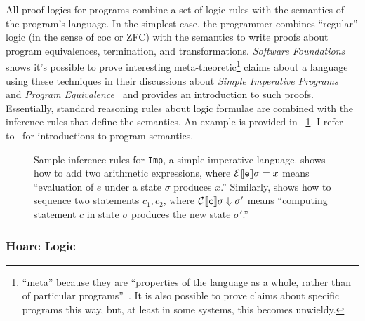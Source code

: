 All proof-logics for programs combine a set of logic-rules with the semantics of
the program's language. In the simplest case, the programmer combines
``regular'' logic (in the sense of \gls{coc} or ZFC) with the semantics to write
proofs about program equivalences, termination, and transformations.
\emph{Software Foundations} shows it's possible to prove interesting
meta-theoretic\footnote{``meta'' because they are ``properties of the language
as a whole, rather than of particular programs''~\cite{Pierce:SF2}. It is also
possible to prove claims about specific programs this way, but, at least in some
systems, this becomes unwieldy.} claims about a language using these techniques
in their discussions about \emph{Simple Imperative Programs}~\cite{Pierce:SF1}
and \emph{Program Equivalence}~\cite{Pierce:SF2} and provides an introduction to
such proofs. Essentially, standard reasoning rules about logic formulae are
combined with the inference rules that define the semantics. An example is
provided in \figurename~\ref{F:Imp_ex}. I refer
to~\cite{Winskel_1993,Harper_2016} for introductions to program semantics.

\begin{figure}
    \centering
    \caption{Sample inference rules for \texttt{Imp}, a simple imperative
    language.  shows how to add two arithmetic expressions, where
    \(\eval{e}{\sigma} = x\) means ``evaluation of \(e\) under a state
    \(\sigma\) produces \(x\).'' Similarly,  shows how to sequence
    two statements \(c_1, c_2\), where \(\comp{c}{\sigma} \DownTo \sigma'\)
    means ``computing statement \(c\) in state \(\sigma\) produces the new state
    \(\sigma'\).''}\label{F:Imp_ex}
\end{figure}

\subsubsection{Hoare Logic}

